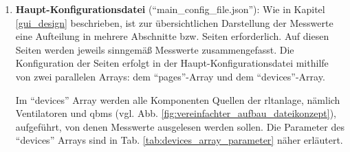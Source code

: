\begin{enumerate}
	
	\item \textbf{Haupt-Konfigurationsdatei} (\enquote{main\_config\_file.json}):
	Wie in Kapitel \ref{gui_design} beschrieben, ist zur übersichtlichen Darstellung der Messwerte eine Aufteilung in mehrere Abschnitte bzw. Seiten erforderlich. Auf diesen Seiten werden jeweils sinngemäß Messwerte zusammengefasst. Die Konfiguration der Seiten erfolgt in der Haupt-Konfigurationsdatei mithilfe von zwei parallelen Arrays: dem \enquote{pages}-Array und dem \enquote{devices}-Array. 	
	
	Im \enquote{devices} Array werden alle Komponenten \bzw Quellen der \acs{rltanlage}, nämlich Ventilatoren und \gls{qbm}s (vgl. Abb. \ref{fig:vereinfachter_aufbau_dateikonzept}), aufgeführt, von denen Messwerte ausgelesen werden sollen. Die Parameter des \enquote{devices} Arrays sind in Tab. \ref{tab:devices_array_parameter} näher erläutert.


\end{enumerate}
